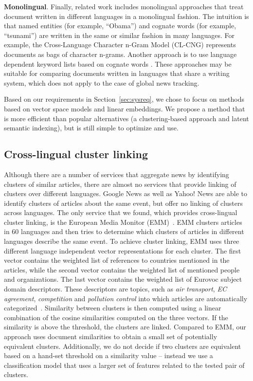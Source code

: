 \documentclass[twoside,11pt]{article}
\begin{document}
\textbf{Monolingual}. Finally, related work includes monolingual approaches that treat document written in different languages in a monolingual fashion. The intuition is that named entities (for example, ``Obama'') and cognate words (for example, ``tsunami'') are written in the same or similar fashion in many languages. For example, the Cross-Language Character n-Gram Model (CL-CNG) \cite{plagiarism} represents documents as bags of character n-grams. Another approach is to use language dependent keyword lists based on cognate words \cite{pouliquen2008story}. These approaches may be suitable for comparing documents written in languages that share a writing system, which does not apply to the case of global news tracking.

Based on our requirements in Section~\ref{sec:sysreq}, we chose to focus on methods based on vector space models and linear embeddings. We propose a method that is more efficient than popular alternatives (a clustering-based approach and latent semantic indexing), but is still simple to optimize and use.

\subsection{Cross-lingual cluster linking}

Although there are a number of services that aggregate news by identifying clusters of similar articles, there are almost no services that provide linking of clusters over different languages. Google News as well as Yahoo! News are able to identify clusters of articles about the same event, but offer no linking of clusters across languages. The only service that we found, which provides cross-lingual cluster linking, is the European Media Monitor (EMM)~\cite{pouliquen2008story,Steinberger2008}. EMM clusters articles in 60 languages and then tries to determine which clusters of articles in different languages describe the same event. To achieve cluster linking, EMM uses three different language independent vector representations for each cluster. The first vector contains the weighted list of references to countries mentioned in the articles, while the second vector contains the weighted list of mentioned people and organizations. The last vector contains the weighted list of Eurovoc subject domain descriptors. These descriptors are topics, such as \emph{air transport}, \emph{EC agreement}, \emph{competition} and \emph{pollution control} into which articles are automatically categorized~. Similarity between clusters is then computed using a linear combination of the cosine similarities computed on the three vectors. If the similarity is above the threshold, the clusters are linked. Compared to EMM, our approach uses document similarities to obtain a small set of potentially equivalent clusters. Additionally, we do not decide if two clusters are equivalent based on a hand-set threshold on a similarity value -- instead we use a classification model that uses a larger set of features related to the tested pair of clusters.
\end{document}
